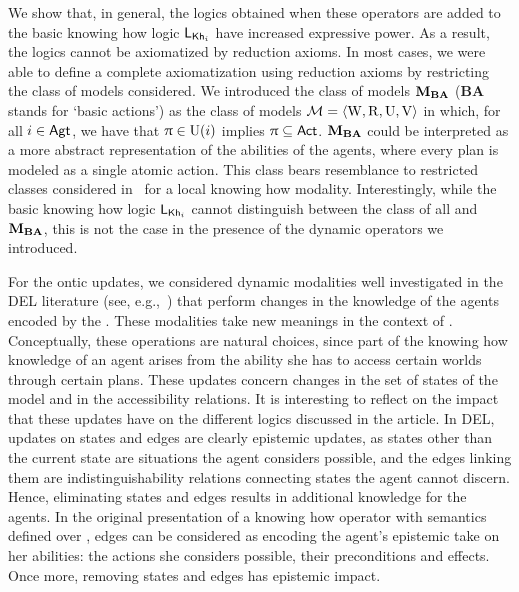 We show that, in general, the logics obtained when these operators are added to the basic knowing how logic $\mathsf{L}_{{\sf Kh}_i}$ have increased expressive power.  As a result, the logics cannot be axiomatized by reduction axioms. 
In most cases, we were able to define a complete axiomatization using reduction axioms by restricting the class of models considered.  We introduced the class of models $\mathbf{M}_{\mathbf{BA}}$ (\textbf{BA} stands for `basic actions') as the class of models $\mathcal{M} = \langle \operatorname{W}, \operatorname{R}, \operatorname{U}, \operatorname{V} \rangle$ in which, for all $i \in {\rm \sf Agt}$, we have that $\uppi \in \operatorname{U}(i)$ implies $\uppi \subseteq {\rm \sf Act}$.  $\mathbf{M}_{\mathbf{BA}}$ could be interpreted as a more abstract representation of the abilities of the agents, where every plan is modeled as a single atomic action.  This class bears resemblance to restricted classes considered in~\cite{Li21} for a local knowing how modality.
Interestingly, while the basic knowing how logic $\mathsf{L}_{{\sf Kh}_i}$ cannot distinguish between the class of all \ults and $\mathbf{M}_{\mathbf{BA}}$, this is not the case in the presence of the dynamic operators we introduced. 

For the ontic updates, we considered dynamic modalities well investigated in the DEL literature (see, e.g.,~\cite{Plaza89:lopc,KooiR11,DELbook}) that perform changes in the knowledge of the agents encoded by the \lts. These modalities take new meanings in the context of .  Conceptually, these operations are natural choices, since part of the knowing how knowledge of an agent arises from the ability she has to access certain worlds through certain plans.  These updates concern changes in the set of states of the model and in the accessibility relations.  It is interesting to reflect on the impact that these updates have on the different logics discussed in the article.  In DEL, updates on states and edges are clearly epistemic updates, as states other than the current state are situations the agent considers possible, and the edges linking them are indistinguishability relations connecting states the agent cannot discern.  Hence, eliminating states and edges results in additional knowledge for the agents.  In the original presentation of a knowing how operator with semantics defined over \lts, edges can be considered as encoding the agent's epistemic take on her abilities: the actions she considers possible, their preconditions and effects.  Once more, removing states and edges has epistemic impact.  


